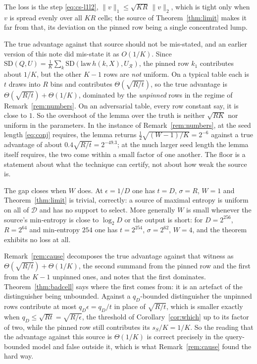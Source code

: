 \documentclass{aicr-solution}
\newcommand{\SD}{\mathrm{SD}}
\newcommand{\calD}{\mathcal{D}}
\newcommand{\calR}{\mathcal{R}}
\begin{document}
\begin{remark}\label{rem:cause}
The loss is the step \eqref{eq:cs-l1l2}, $\|v\|_1 \le \sqrt{KR}\,\|v\|_2$, which is tight only when
$v$ is spread evenly over all $KR$ cells; the source of Theorem~\ref{thm:limit} makes it far from
that, its deviation on the pinned row being a single concentrated lump.

The true advantage against that source should not be mis-stated, and an earlier version of this note
did mis-state it as $O(1/K)$. Since
$\SD(Q,U) = \frac1K\sum_k \SD(\mathrm{law}\,h(k,X), U_\calR)$, the pinned row $k_1$ contributes about
$1/K$, but the other $K-1$ rows are \emph{not} uniform. On a typical table each is $t$ draws into
$R$ bins and contributes $\Theta(\sqrt{R/t})$, so the true advantage is
$\Theta(\sqrt{R/t}) + \Theta(1/K)$, dominated by the \emph{unpinned} rows in the regime of
Remark~\ref{rem:numbers}. On an adversarial table, every row constant say, it is close to
$1$. So the overshoot of the lemma over the truth is neither $\sqrt{RK}$ nor uniform in the
parameters. In the instance of Remark~\ref{rem:numbers}, at the seed length \eqref{eq:conj}
requires, the lemma returns $\tfrac12\sqrt{(W-1)/K} = 2^{-6}$ against a true advantage of about
$0.4\sqrt{R/t} = 2^{-49.3}$; at the much larger seed length the lemma itself requires, the two come
within a small factor of one another. The floor is a statement about what the technique can certify,
not about how weak the source is.

The gap closes when $W$ does. At $\epsilon = 1/D$ one has $t = D$, $\sigma = R$, $W = 1$ and
Theorem~\ref{thm:limit} is trivial, correctly: a source of maximal entropy is uniform on all of
$\calD$ and has no support to select. More generally $W$ is small whenever the source's min-entropy
is close to $\log_2 D$ or the output is short: for $D = 2^{256}$, $R = 2^{64}$ and min-entropy $254$
one has $t = 2^{254}$, $\sigma = 2^{62}$, $W = 4$, and the theorem exhibits no loss at all.
\end{remark}

\begin{remark}\label{rem:qwitness}
Remark~\ref{rem:cause} decomposes the true advantage against that witness as
$\Theta(\sqrt{R/t}) + \Theta(1/K)$, the second summand from the pinned row and the first from the
$K-1$ unpinned ones, and notes that the first dominates. Theorem~\ref{thm:badcell} says where the
first comes from: it is an artefact of the distinguisher being unbounded. Against a $q_D$-bounded
distinguisher the unpinned rows contribute at most $q_D\epsilon = q_D/t$ in place of
$\sqrt{R/t}$, which is smaller exactly when $q_D \le \sqrt{Rt} = \sqrt{R/\epsilon}$, the threshold
of Corollary~\ref{cor:which} up to its factor of two, while the pinned row still contributes its
$s_S/K = 1/K$. So the reading that the advantage against this source is $\Theta(1/K)$ is correct precisely in the
query-bounded model and false outside it, which is what Remark~\ref{rem:cause} found the hard way.
\end{remark}
\end{document}
